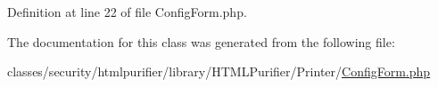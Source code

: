 Definition at line 22 of file Config\+Form.\+php.



The documentation for this class was generated from the following file\+:\begin{DoxyCompactItemize}
\item 
classes/security/htmlpurifier/library/\+H\+T\+M\+L\+Purifier/\+Printer/\hyperlink{ConfigForm_8php}{Config\+Form.\+php}\end{DoxyCompactItemize}
